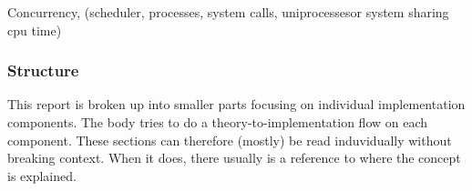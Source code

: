 Concurrency, (scheduler, processes, system calls, uniprocessesor system sharing cpu time)

\subsubsection*{Structure}
This report is broken up into smaller parts focusing on individual implementation components. The body tries to do a theory-to-implementation 
flow on each component. These sections can therefore (mostly) be read induvidually without breaking context. When it does, there usually is a 
reference to where the concept is explained.
